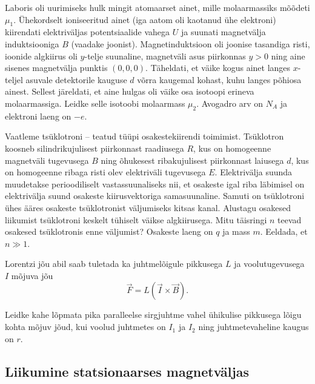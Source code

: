 \documentclass[a4paper,11pt,twocolumn]{article}
\begin{document}
\begin{question}[Piirk 2013, G10][em2][4cm]
    Laboris oli uurimiseks hulk mingit atomaarset ainet, mille molaarmassiks mõõdeti $\mu_1$. Ühekordselt ioniseeritud ainet (iga aatom oli kaotanud ühe elektroni) kiirendati elektriväljas potentsiaalide vahega $U$ ja suunati magnetvälja induktsiooniga $B$ (vaadake joonist). Magnetinduktsioon oli joonise tasandiga risti, ioonide algkiirus oli $y$-telje suunaline, magnetväli asus piirkonnas $y > 0$ ning aine sisenes magnetvälja punktis $(0, 0, 0)$. Täheldati, et väike kogus ainet langes $x$-teljel asuvale detektorile kauguse $d$ võrra kaugemal kohast, kuhu langes põhiosa ainest. Sellest järeldati, et aine hulgas oli väike osa isotoopi erineva molaarmassiga. Leidke selle isotoobi molaarmass $\mu_2$. Avogadro arv on $N_A$ ja elektroni laeng on $−e$.
\end{question}

\begin{question}[Piirk 2018, G10]
    Vaatleme tsüklotroni -- teatud tüüpi osakestekiirendi toimimist. Tsüklotron koosneb silindrikujulisest piirkonnast raadiusega $R$, kus on homogeenne magnetväli tugevusega $B$ ning õhukesest ribakujulisest piirkonnast laiusega $d$, kus on homogeenne ribaga risti olev elektriväli tugevusega $E$. Elektrivälja suunda muudetakse perioodiliselt vastassuunaliseks nii, et osakeste igal riba läbimisel on elektrivälja suund osakeste kiirusvektoriga samasuunaline. Samuti on tsüklotroni ühes ääres osakeste tsüklotronist väljumiseks kitsas kanal. Alustagu osakesed liikumist tsüklotroni keskelt tühiselt väikse algkiirusega. Mitu täisringi $n$ teevad osakesed tsüklotronis enne väljumist? Osakeste laeng on $q$ ja mass $m$. Eeldada, et $n\gg 1$.
\end{question}

Lorentzi jõu abil saab tuletada ka juhtmelõigule pikkusega $L$ ja voolutugevusega $I$ mõjuva jõu
\begin{equation}
    \vec{F}=L(\vec{I}\times \vec{B}) \tag{Ampere'i seadus}.
\end{equation}

\begin{question}
    Leidke kahe lõpmata pika paralleelse sirgjuhtme vahel ühikulise pikkusega lõigu kohta mõjuv jõud, kui voolud juhtmetes on \( I_1 \) ja \( I_2 \) ning juhtmetevaheline kaugus on \( r \).
\end{question}

\subsection{Liikumine statsionaarses magnetväljas}
\end{document}
